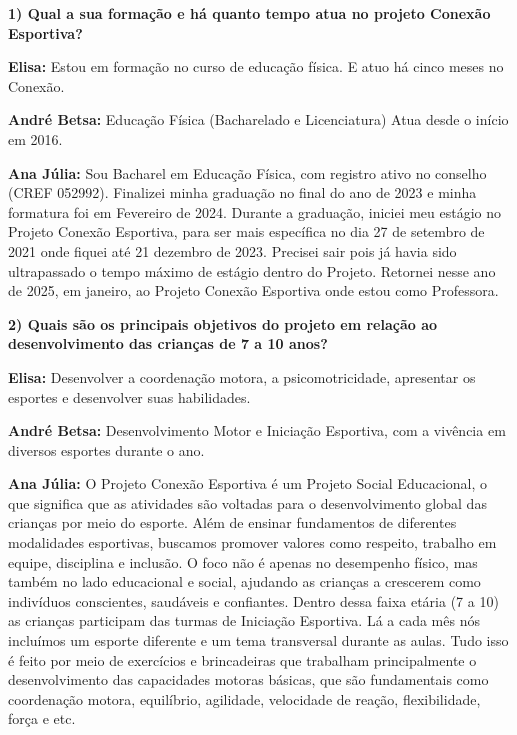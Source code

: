 
\textbf{1) Qual a sua formação e há quanto tempo atua no projeto Conexão Esportiva?}

\textbf{Elisa:} Estou em formação no curso de educação física. E atuo há cinco meses no Conexão.

\textbf{André Betsa:} Educação Física (Bacharelado e Licenciatura) Atua desde o início em 2016.

\textbf{Ana Júlia:} Sou Bacharel em Educação Física, com registro ativo no conselho (CREF 052992). Finalizei minha graduação no final do ano de 2023 e minha formatura foi em Fevereiro de 2024. Durante a graduação, iniciei meu estágio no Projeto Conexão Esportiva, para ser mais específica no dia 27 de setembro de 2021 onde fiquei até 21 dezembro de 2023. Precisei sair pois já havia sido ultrapassado o tempo máximo de estágio dentro do Projeto. Retornei nesse ano de 2025, em janeiro, ao Projeto Conexão Esportiva onde estou como Professora.

\textbf{2) Quais são os principais objetivos do projeto em relação ao desenvolvimento das crianças de 7 a 10 anos?}

\textbf{Elisa:} Desenvolver a coordenação motora, a psicomotricidade, apresentar os esportes e desenvolver suas habilidades.

\textbf{André Betsa:} Desenvolvimento Motor e Iniciação Esportiva, com a vivência em diversos esportes durante o ano.

\textbf{Ana Júlia:} O Projeto Conexão Esportiva é um Projeto Social Educacional, o que significa que as atividades são voltadas para o desenvolvimento global das crianças por meio do esporte. Além de ensinar fundamentos de diferentes modalidades esportivas, buscamos promover valores como respeito, trabalho em equipe, disciplina e inclusão. O foco não é apenas no desempenho físico, mas também no lado educacional e social, ajudando as crianças a crescerem como indivíduos conscientes, saudáveis e confiantes. Dentro dessa faixa etária (7 a 10) as crianças participam das turmas de Iniciação Esportiva. Lá a cada mês nós incluímos um esporte diferente e um tema transversal durante as aulas. Tudo isso é feito por meio de exercícios e brincadeiras que trabalham principalmente o desenvolvimento das capacidades motoras básicas, que são fundamentais como coordenação motora, equilíbrio, agilidade, velocidade de reação, flexibilidade, força e etc.

